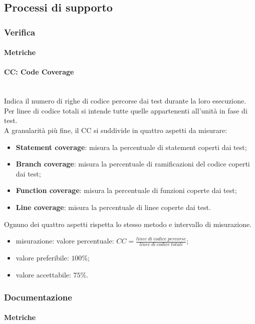 \subsection{Processi di supporto}
	\subsubsection{Verifica}
		\paragraph{Metriche}
			\paragraph*{CC: Code Coverage}\mbox{}\\
				Indica il numero di righe di codice percorse dai test durante la loro esecuzione. Per linee di codice totali si intende tutte quelle appartenenti all'unità in fase di test.\\
				A granularità più fine, il CC si suddivide in quattro aspetti da misurare:
				\begin{itemize}
					\item \textbf{Statement coverage}: misura la percentuale di statement coperti dai test;
					\item \textbf{Branch coverage}: misura la percentuale di ramificazioni del codice coperti dai test;
					\item \textbf{Function coverage}: misura la percentuale di funzioni coperte dai test;
					\item \textbf{Line coverage}: misura la percentuale di linee coperte dai test.
				\end{itemize}
				Ognuno dei quattro aspetti rispetta lo stesso metodo e intervallo di misurazione.
				\begin{itemize}
					\item misurazione: valore percentuale: $CC = \frac{linee\ di\ codice\ percorse}{linee\ di\ codice\ totali}$;
					\item valore preferibile: $100\%$;
					\item valore accettabile: $75\%$.
				\end{itemize}
	\subsubsection{Documentazione}
		\paragraph{Metriche}
